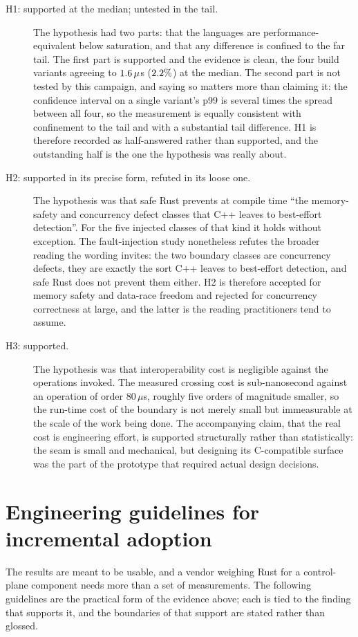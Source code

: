 \documentclass[english,twoside,openright,a4paper,censored,csm,software-track-2020]{HYthesisML}
\begin{document}
\begin{description}
  \item[H1: supported at the median; untested in the tail.] The hypothesis had two parts:
        that the languages are performance-equivalent below saturation, and that any
        difference is confined to the far tail. The first part is supported and the evidence
        is clean, the four build variants agreeing to $1.6\,\mu$s
        ($2.2\%$) at the median. The second part is not tested by this campaign, and
        saying so matters more than claiming it: the confidence interval on a single variant's
        p99 is several times the spread between all four, so the measurement is equally
        consistent with confinement to the tail and with a substantial tail difference. H1 is
        therefore recorded as half-answered rather than supported, and the outstanding half is
        the one the hypothesis was really about.
  \item[H2: supported in its precise form, refuted in its loose one.] The hypothesis was
        that safe Rust prevents at compile time ``the memory-safety and concurrency defect
        classes that C++ leaves to best-effort detection''. For the five injected classes of
        that kind it holds without exception. The fault-injection study nonetheless refutes
        the broader reading the wording invites: the two boundary classes are concurrency
        defects, they are exactly the sort C++ leaves to best-effort detection, and safe Rust
        does not prevent them either. H2 is therefore accepted for memory safety and
        data-race freedom and rejected for concurrency correctness at large, and the latter is
        the reading practitioners tend to assume.
  \item[H3: supported.] The hypothesis was that interoperability cost is negligible against
        the operations invoked. The measured crossing cost is sub-nanosecond against an
        operation of order $80\,\mu$s, roughly five orders of magnitude smaller, so the
        run-time cost of the boundary is not merely small but immeasurable at the scale of the
        work being done. The accompanying claim, that the real cost is engineering effort, is
        supported structurally rather than statistically: the seam is small and mechanical,
        but designing its C-compatible surface was the part of the prototype that required
        actual design decisions.
\end{description}

\section{Engineering guidelines for incremental adoption}
\label{sec:guidelines}
The results are meant to be usable, and a vendor weighing Rust for a control-plane component
needs more than a set of measurements. The following guidelines are the practical form of the
evidence above; each is tied to the finding that supports it, and the boundaries of that
support are stated rather than glossed.
\end{document}
